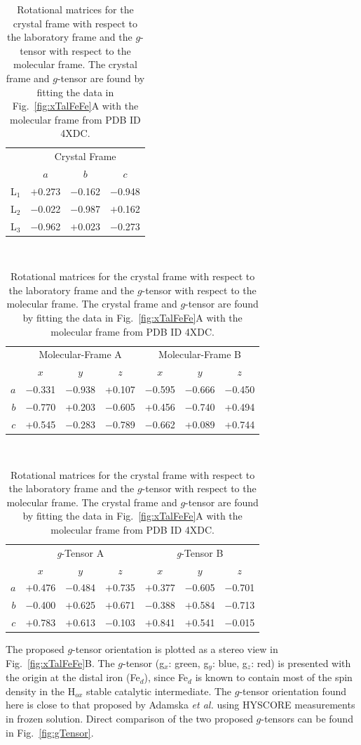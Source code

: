 \begin{table}[ht]
\caption[Rotational matrices for the crystal frame.]{Rotational matrices  for the crystal frame with respect to the laboratory frame and the $g$-tensor with respect to the molecular frame. The crystal frame and $g$-tensor are found by fitting the data in Fig.~\ref{fig:xTalFeFe}A with the molecular frame from PDB ID 4XDC.}
\centering
\hspace{-12.825em}
\begin{tabular}{r|ccc}
 & \multicolumn{3}{c}{Crystal Frame} \\
\multicolumn{1}{l|}{} & $a$ & $b$ & $c$ \\ \hline \hline
L$_1$ & $+$0.273 & $-$0.162 & $-$0.948 \\
L$_2$ & $-$0.022 & $-$0.987 & $+$0.162 \\
L$_3$ & $-$0.962 & $+$0.023 & $-$0.273
\end{tabular}\label{table:frames} \\
\vspace{0.5cm}
\begin{tabular}{r|ccc|ccc}
 & \multicolumn{3}{c|}{Molecular-Frame A} & \multicolumn{3}{c}{Molecular-Frame B} \\
 & $x$ & $y$ & $z$ & $x$ & $y$ & $z$ \\ \hline \hline
$a$ & $-$0.331 & $-$0.938 & +0.107 & $-$0.595 & $-$0.666 & $-$0.450 \\
$b$ & $-$0.770 & +0.203 & $-$0.605 & +0.456 & $-$0.740 & +0.494 \\
$c$ & +0.545 & $-$0.283 & $-$0.789 & $-$0.662 & +0.089 & +0.744
\end{tabular}\\
\vspace{0.5cm}
\begin{tabular}{r|ccc|ccc}
 & \multicolumn{3}{c|}{\textit{g}-Tensor A} & \multicolumn{3}{c}{\textit{g}-Tensor B} \\
 & $x$ & $y$ & $z$ & $x$ & $y$ & $z$ \\ \hline \hline
$a$ & $+$0.476 & $-$0.484 & $+$0.735 & $+$0.377 & $-$0.605 & $-$0.701 \\
$b$ & $-$0.400 & $+$0.625 & $+$0.671 & $-$0.388 & $+$0.584 & $-$0.713 \\
$c$ & $+$0.783 & $+$0.613 & $-$0.103 & $+$0.841 & $+$0.541 & $-$0.015
\end{tabular}
\end{table}

The proposed $g$-tensor orientation is plotted as a stereo view in Fig.~\ref{fig:xTalFeFe}B. The $g$-tensor (g$_x$: green, g$_y$: blue, g$_z$: red) is presented with the origin at the distal iron (Fe$_d$), since Fe$_d$ is known to contain most of the spin density in the H$_{ox}$ stable catalytic intermediate. \cite{FiedlerDFT,GrecoDFT} The $g$-tensor orientation found here is close to that proposed by Adamska {\em et al.} using HYSCORE measurements in frozen solution. \cite{Adamska2015} Direct comparison of the two proposed $g$-tensors can be found in Fig.~\ref{fig:gTensor}. 

